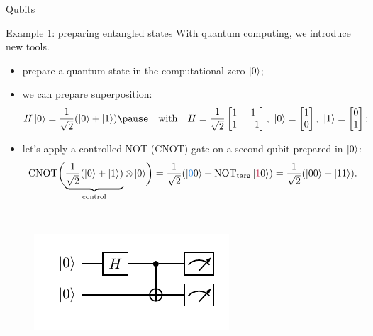 \documentclass[8pt, xcolor={svgnames}, hyperref={linkcolor=black}]{beamer}
\begin{document}
\begin{frame}{Qubits}
\begin{figure}
        \end{figure}        
\end{frame}


\begin{frame}{Example 1: preparing entangled states}
\pause
With quantum computing, we introduce new tools.
\begin{itemize}[noitemsep]
\item[\faRocket] prepare a quantum state in the computational zero $\ket{0}$;
\item[\faSliders] we can prepare superposition: 
$$H\ket{0} = \frac{1}{\sqrt{2}}(\ket{0} + \ket{1}) \pause \quad \text{with} \quad H = \frac{1}{\sqrt{2}}
\begin{bmatrix} 1 & 1 \\ 1 & -1 \end{bmatrix},\,\, \ket{0}=\begin{bmatrix} 1 \\ 0 
\end{bmatrix},\,\,\ket{1}=\begin{bmatrix} 0 \\ 1 \end{bmatrix};$$
\item[\faShareAlt] let's apply a controlled-NOT (CNOT) gate on a second qubit prepared in $\ket{0}$:
$$ \text{CNOT} \biggl( \underbrace{\frac{1}{\sqrt{2}}(\ket{0} + \ket{1})}_{\text{control}}\otimes 
\ket{0} \biggr) = \frac{1}{\sqrt{2}}(\ket{\textcolor{bleudefrance}{0}0} + 
\text{NOT}_{\rm targ}\ket{\textcolor{brightmaroon}{1}0}) = \frac{1}{\sqrt{2}}(\ket{00} + \ket{11}). $$
\end{itemize}
\pause
\begin{multicols}{2}
\texttt{\\}
\begin{figure}
   \includegraphics[width=1\linewidth]{figures/baby3.pdf} %

\end{figure}
\end{multicols}
\end{frame}
\end{document}
